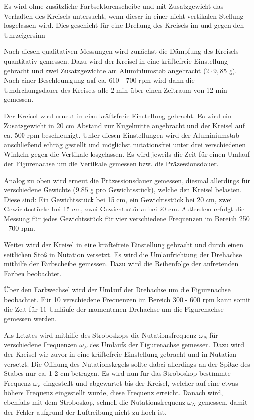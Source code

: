 \documentclass[12pt,a4paper,german]{scrartcl}
\numberwithin{equation}{section}
\begin{document}
  Es wird ohne zusätzliche Farbsektorenscheibe und mit Zusatzgewicht das Verhalten des Kreisels untersucht, wenn dieser in einer nicht vertikalen Stellung losgelassen wird.
  Dies geschieht für eine Drehung des Kreisels im und gegen den Uhrzeigersinn.

  Nach diesen qualitativen Messungen wird zunächst die Dämpfung des Kreisels quantitativ gemessen.
  Dazu wird der Kreisel in eine kräftefreie Einstellung gebracht und zwei Zusatzgewichte am Aluminiumstab angebracht ($2 \cdot 9,85$ g).
  Nach einer Beschleunigung auf ca. 600 - 700 rpm wird dann die Umdrehungsdauer des Kreisels alle 2 min über einen Zeitraum von 12 min gemessen.

  Der Kreisel wird erneut in eine kräftefreie Einstellung gebracht.
  Es wird ein Zusatzgewicht in 20 cm Abstand zur Kugelmitte angebracht und der Kreisel auf ca. 500 rpm beschleunigt.
  Unter diesen Einstellungen wird der Aluminiumstab anschließend schräg gestellt und möglichst nutationsfrei unter drei verschiedenen Winkeln gegen die Vertikale losgelassen.
  Es wird jeweils die Zeit für einen Umlauf der Figurenachse um die Vertikale gemessen bzw. die Präzessionsdauer.

  Analog zu oben wird erneut die Präzessionsdauer gemessen, diesmal allerdings für verschiedene Gewichte ($9.85$ g pro Gewichtsstück), welche den Kreisel belasten.
  Diese sind: Ein Gewichtsstück bei 15 cm, ein Gewichtsstück bei 20 cm, zwei Gewichtsstücke bei 15 cm, zwei Gewichtsstücke bei 20 cm.
  Außerdem erfolgt die Messung für jedes Gewichtsstück für vier verschiedene Frequenzen im Bereich 250 - 700 rpm.
  
  Weiter wird der Kreisel in eine kräftefreie Einstellung gebracht und durch einen seitlichen Stoß in Nutation versetzt.
  Es wird die Umlaufrichtung der Drehachse mithilfe der Farbscheibe gemessen. Dazu wird die Reihenfolge der aufretenden Farben beobachtet.

  Über den Farbwechsel wird der Umlauf der Drehachse um die Figurenachse beobachtet.
  Für 10 verschiedene Frequenzen im Bereich 300 - 600 rpm kann somit die Zeit für 10 Umläufe der momentanen Drehachse um die Figurenachse gemessen werden.

  Als Letztes wird mithilfe des Stroboskops die Nutationsfrequenz $\omega_N$ für verschiedene Frequenzen $\omega_F$ des Umlaufs der Figurenachse gemessen.
  Dazu wird der Kreisel wie zuvor in eine kräftefreie Einstellung gebracht und in Nutation versetzt.
  Die Öffnung des Nutationskegels sollte dabei allerdings an der Spitze des Stabes nur ca. 1-2 cm betragen.
  Es wird nun für das Stroboskop bestimmte Frequenz $\omega_F$ eingestellt und abgewartet bis der Kreisel, welcher auf eine etwas höhere Frequenz eingestellt wurde, diese Frequenz erreicht.
  Danach wird, ebenfalls mit dem Stroboskop, schnell die Nutationsfrequenz $\omega_N$ gemessen, damit der Fehler aufgrund der Luftreibung nicht zu hoch ist.
\end{document}
